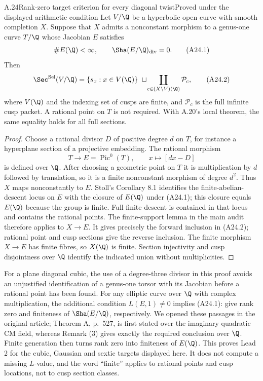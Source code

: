 \begin{statement}{A.24}{Rank-zero target criterion for every diagonal twist}{Proved under the displayed arithmetic condition}
Let $V/\Q$ be a hyperbolic open curve with smooth completion $X$. Suppose that $X$ admits a nonconstant morphism to a genus-one curve $T/\Q$ whose Jacobian $E$ satisfies
\[
\#E(\Q)<\infty,\qquad \Sha(E/\Q)_{\mathrm{div}}=0.
\tag{A24.1}
\]
Then
\[
\Sec^{\mathrm{Sel}}(V/\Q)
=\{s_x:x\in V(\Q)\}\ \sqcup\!
\coprod_{c\in(X\setminus V)(\Q)}\mathcal P_c,
\tag{A24.2}
\]
where $V(\Q)$ and the indexing set of cusps are finite, and $\mathcal P_c$ is the full infinite cusp packet. A rational point on $T$ is not required. With A.20's local theorem, the same equality holds for all full sections.
\end{statement}
\begin{proof}
Choose a rational divisor $D$ of positive degree $d$ on $T$, for instance a hyperplane section of a projective embedding. The rational morphism
\[
T\longrightarrow E=\operatorname{Pic}^0(T),\qquad x\longmapsto[d x-D]
\]
is defined over $\Q$. After choosing a geometric point on $T$ it is multiplication by $d$ followed by translation, so it is a finite nonconstant morphism of degree $d^2$. Thus $X$ maps nonconstantly to $E$. Stoll's Corollary 8.1 identifies the finite-abelian-descent locus on $E$ with the closure of $E(\Q)$ under (A24.1); this closure equals $E(\Q)$ because the group is finite. Full finite descent is contained in that locus and contains the rational points. The finite-support lemma in the main audit therefore applies to $X\to E$. It gives precisely the forward inclusion in (A24.2); rational point and cusp sections give the reverse inclusion. The finite morphism $X\to E$ has finite fibres, so $X(\Q)$ is finite. Section injectivity and cusp disjointness over $\Q$ identify the indicated union without multiplicities.
\end{proof}

For a plane diagonal cubic, the use of a degree-three divisor in this proof avoids an unjustified identification of a genus-one torsor with its Jacobian before a rational point has been found. For any elliptic curve over $\Q$ with complex multiplication, the additional condition $L(E,1)\ne0$ implies (A24.1): \citet[Corollary C and Remark (3), p.~528]{AMRubin1987} give rank zero and finiteness of $\Sha(E/\Q)$, respectively. We opened these passages in the original article; Theorem A, p.~527, is first stated over the imaginary quadratic CM field, whereas Remark (3) gives exactly the required conclusion over $\Q$. Finite generation then turns rank zero into finiteness of $E(\Q)$. This proves Lead 2 for the cubic, Gaussian and sextic targets displayed here. It does not compute a missing $L$-value, and the word ``finite'' applies to rational points and cusp locations, not to cusp section classes.

